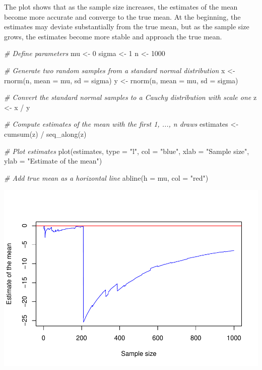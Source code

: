 \documentclass[
  a4paper,
]{article}
\newenvironment{Shaded}{\begin{snugshade}}{\end{snugshade}}
\newcommand{\AttributeTok}[1]{\textcolor[rgb]{0.77,0.63,0.00}{#1}}
\newcommand{\CommentTok}[1]{\textcolor[rgb]{0.56,0.35,0.01}{\textit{#1}}}
\newcommand{\DecValTok}[1]{\textcolor[rgb]{0.00,0.00,0.81}{#1}}
\newcommand{\FunctionTok}[1]{\textcolor[rgb]{0.00,0.00,0.00}{#1}}
\newcommand{\NormalTok}[1]{#1}
\newcommand{\OtherTok}[1]{\textcolor[rgb]{0.56,0.35,0.01}{#1}}
\newcommand{\SpecialCharTok}[1]{\textcolor[rgb]{0.00,0.00,0.00}{#1}}
\newcommand{\StringTok}[1]{\textcolor[rgb]{0.31,0.60,0.02}{#1}}
\begin{document}
The plot shows that as the sample size increases, the estimates of the
mean become more accurate and converge to the true mean. At the
beginning, the estimates may deviate substantially from the true mean,
but as the sample size grows, the estimates become more stable and
approach the true mean.

\begin{Shaded}
\begin{Highlighting}[]
\CommentTok{\# Define parameters}
\NormalTok{mu }\OtherTok{\textless{}{-}} \DecValTok{0}
\NormalTok{sigma }\OtherTok{\textless{}{-}} \DecValTok{1}
\NormalTok{n }\OtherTok{\textless{}{-}} \DecValTok{1000}

\CommentTok{\# Generate two random samples from a standard normal distribution}
\NormalTok{x }\OtherTok{\textless{}{-}} \FunctionTok{rnorm}\NormalTok{(n, }\AttributeTok{mean =}\NormalTok{ mu, }\AttributeTok{sd =}\NormalTok{ sigma)}
\NormalTok{y }\OtherTok{\textless{}{-}} \FunctionTok{rnorm}\NormalTok{(n, }\AttributeTok{mean =}\NormalTok{ mu, }\AttributeTok{sd =}\NormalTok{ sigma)}

\CommentTok{\# Convert the standard normal samples to a Cauchy distribution with scale one}
\NormalTok{z }\OtherTok{\textless{}{-}}\NormalTok{ x }\SpecialCharTok{/}\NormalTok{ y}

\CommentTok{\# Compute estimates of the mean with the first 1, ..., n draws}
\NormalTok{estimates }\OtherTok{\textless{}{-}} \FunctionTok{cumsum}\NormalTok{(z) }\SpecialCharTok{/} \FunctionTok{seq\_along}\NormalTok{(z)}

\CommentTok{\# Plot estimates}
\FunctionTok{plot}\NormalTok{(estimates, }\AttributeTok{type =} \StringTok{"l"}\NormalTok{, }\AttributeTok{col =} \StringTok{"blue"}\NormalTok{, }\AttributeTok{xlab =} \StringTok{"Sample size"}\NormalTok{, }\AttributeTok{ylab =} \StringTok{"Estimate of the mean"}\NormalTok{)}

\CommentTok{\# Add true mean as a horizontal line}
\FunctionTok{abline}\NormalTok{(}\AttributeTok{h =}\NormalTok{ mu, }\AttributeTok{col =} \StringTok{"red"}\NormalTok{)}
\end{Highlighting}
\end{Shaded}

\includegraphics{RMarkdown_files/figure-latex/three-1.pdf}
\end{document}
